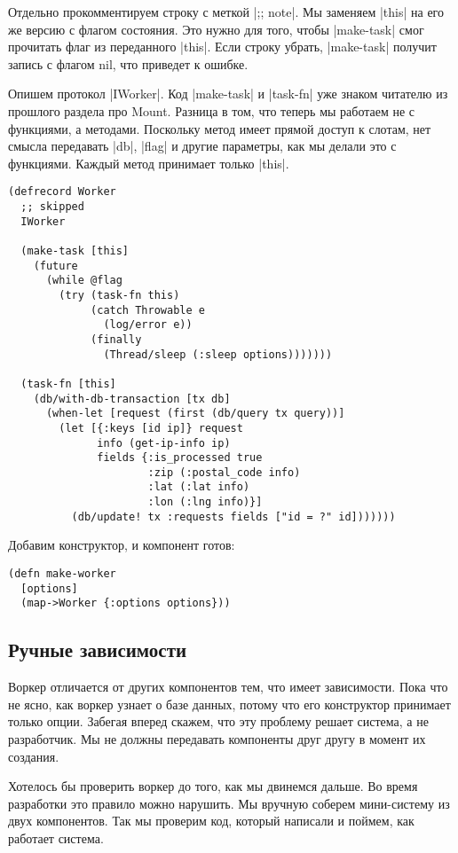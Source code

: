Отдельно прокомментируем строку с меткой \spverb|;; note|. Мы заменяем \spverb|this| на его же
версию с флагом состояния. Это нужно для того, чтобы \spverb|make-task| смог прочитать
флаг из переданного \spverb|this|. Если строку убрать, \spverb|make-task| получит запись с
флагом nil, что приведет к ошибке.

Опишем протокол \spverb|IWorker|. Код \spverb|make-task| и \spverb|task-fn| уже знаком читателю из
прошлого раздела про Mount. Разница в том, что теперь мы работаем не с
функциями, а методами. Поскольку метод имеет прямой доступ к слотам, нет смысла
передавать \spverb|db|, \spverb|flag| и другие параметры, как мы делали это с
функциями. Каждый метод принимает только \spverb|this|.

\begin{verbatim}
(defrecord Worker
  ;; skipped
  IWorker

  (make-task [this]
    (future
      (while @flag
        (try (task-fn this)
             (catch Throwable e
               (log/error e))
             (finally
               (Thread/sleep (:sleep options)))))))

  (task-fn [this]
    (db/with-db-transaction [tx db]
      (when-let [request (first (db/query tx query))]
        (let [{:keys [id ip]} request
              info (get-ip-info ip)
              fields {:is_processed true
                      :zip (:postal_code info)
                      :lat (:lat info)
                      :lon (:lng info)}]
          (db/update! tx :requests fields ["id = ?" id]))))))
\end{verbatim}

Добавим конструктор, и компонент готов:

\begin{verbatim}
(defn make-worker
  [options]
  (map->Worker {:options options}))
\end{verbatim}

\subsection{Ручные зависимости}

Воркер отличается от других компонентов тем, что имеет зависимости. Пока что не
ясно, как воркер узнает о базе данных, потому что его конструктор принимает
только опции. Забегая вперед скажем, что эту проблему решает система, а не
разработчик. Мы не должны передавать компоненты друг другу в момент их создания.

Хотелось бы проверить воркер до того, как мы двинемся дальше. Во время
разработки это правило можно нарушить. Мы вручную соберем мини-систему из двух
компонентов. Так мы проверим код, который написали и поймем, как работает
система.

